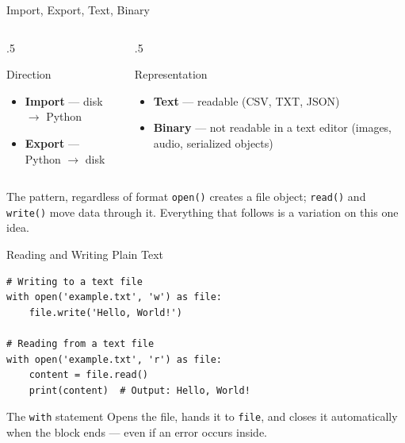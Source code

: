 \documentclass[9pt,aspectratio=169,xcolor=table]{beamer}
\begin{document}
\begin{frame}{Import, Export, Text, Binary}
    \leavevmode
    \begin{columns}[t]
        \begin{column}{.5\textwidth}
            \begin{block}{Direction}
                \small
                \begin{itemize}
                    \item \textbf{Import} --- disk $\to$ Python
                    \item \textbf{Export} --- Python $\to$ disk
                \end{itemize}
            \end{block}
        \end{column}
        \begin{column}{.5\textwidth}
            \begin{block}{Representation}
                \small
                \begin{itemize}
                    \item \textbf{Text} --- readable (CSV, TXT, JSON)
                    \item \textbf{Binary} --- not readable in a text
                          editor (images, audio, serialized objects)
                \end{itemize}
            \end{block}
        \end{column}
    \end{columns}

    \vspace{4mm}
    \begin{alertblock}{The pattern, regardless of format}
        \texttt{open()} creates a file object; \texttt{read()} and
        \texttt{write()} move data through it. Everything that
        follows is a variation on this one idea.
    \end{alertblock}
\end{frame}

\begin{frame}[fragile]{Reading and Writing Plain Text}
    \leavevmode
\begin{lstlisting}
# Writing to a text file
with open('example.txt', 'w') as file:
    file.write('Hello, World!')

# Reading from a text file
with open('example.txt', 'r') as file:
    content = file.read()
    print(content)  # Output: Hello, World!
\end{lstlisting}

    \vspace{2mm}
    \begin{block}{The \texttt{with} statement}
        Opens the file, hands it to \texttt{file}, and \alert{closes
        it automatically} when the block ends --- even if an error
        occurs inside.
    \end{block}
\end{frame}
\end{document}
